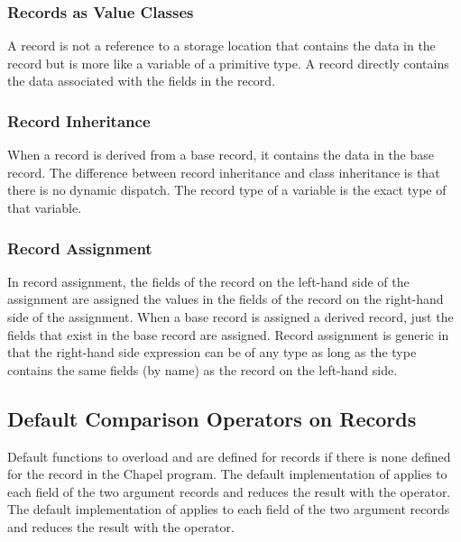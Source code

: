 \subsubsection{Records as Value Classes}
\label{Records_as_Value_Classes}

A record is not a reference to a storage location that contains the
data in the record but is more like a variable of a primitive type.  A
record directly contains the data associated with the fields in the
record.

\subsubsection{Record Inheritance}
\label{Record_Inheritance}

When a record is derived from a base record, it contains the data in
the base record.  The difference between record inheritance and class
inheritance is that there is no dynamic dispatch.  The record type of
a variable is the exact type of that variable.

\subsubsection{Record Assignment}
\label{Record_Assignment}

In record assignment, the fields of the record on the left-hand side
of the assignment are assigned the values in the fields of the record
on the right-hand side of the assignment.  When a base record is
assigned a derived record, just the fields that exist in the base
record are assigned.  Record assignment is generic in that the
right-hand side expression can be of any type as long as the type
contains the same fields (by name) as the record on the left-hand
side.

\subsection{Default Comparison Operators on Records}
\label{Record_Comparison_Operators}

Default functions to overload \chpl{==} and \chpl{\!=} are defined for
records if there is none defined for the record in the Chapel program.
The default implementation of \chpl{==} applies \chpl{==} to each
field of the two argument records and reduces the result with
the \chpl{&&} operator.  The default implementation of \chpl{\!=}
applies \chpl{\!=} to each field of the two argument records and
reduces the result with the \chpl{||} operator.
